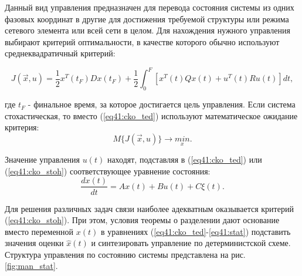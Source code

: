 Данный вид управления предназначен для перевода состояния системы из одних фазовых координат в другие для достижения требуемой структуры или режима сетевого элемента или всей сети в целом. 
Для нахождения нужного управления выбирают критерий оптимальности, в качестве которого обычно используют среднеквадратичный критерий:


\begin{equation}\label{eq41:cko_ted}
J(\vec{x},u)=\frac{1}{2}x^T(t_F)Dx(t_F)+\frac{1}{2}\int^F_0[x^T(t)Qx(t)+u^T(t)Ru(t)]dt,
\end{equation}

\noindent где $t_F$ - финальное время, за которое достигается цель управления. Если система стохастическая, то вместо (\ref{eq41:cko_ted}) используют математическое ожидание критерия:
\begin{equation}\label{eq41:cko_stoh}
M\{J(\vec{x},u)\}\rightarrow \underset{x}{min}.
\end{equation}

Значение управления $u(t)$ находят,  подставляя в (\ref{eq41:cko_ted}) или (\ref{eq41:cko_stoh}) соответствующее уравнение состояния:
\begin{equation}\label{eq41:stat}
\frac{dx(t)}{dt}=Ax(t)+Bu(t)+C\xi(t).
\end{equation}

Для решения различных задач связи наиболее адекватным оказывается критерий (\ref{eq41:cko_stoh}).
При этом, условия теоремы о разделении дают основание вместо переменной $x(t)$ в уравнениях (\ref{eq41:cko_ted}-\ref{eq41:stat}) подставить значения оценки $\hat{x}(t)$ и синтезировать управление по детерминистской схеме.
Структура управления по состоянию системы представлена на рис. \ref{fig:man_stat}.

